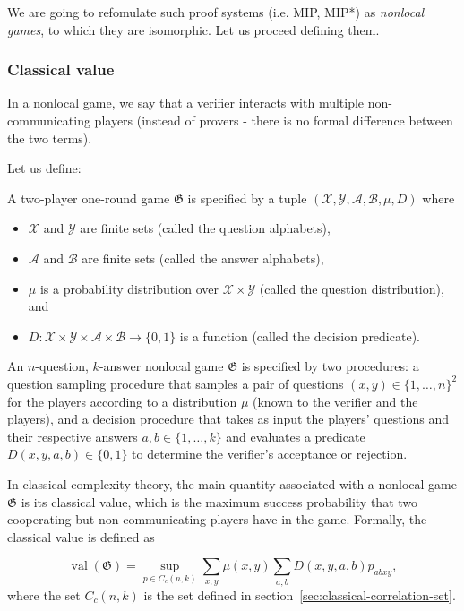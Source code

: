We are going to refomulate such proof systems (i.e. MIP, MIP*) as \emph{nonlocal games}, to which they are isomorphic. Let us proceed defining them.
\subsubsection{Classical value}

In a nonlocal game, we say that a verifier interacts with multiple non-communicating players (instead of provers - there is no formal difference between the two terms). 

Let us define: 

\begin{defn} A two-player one-round game $\mathfrak{G}$ is specified by a tuple $(\mathcal{X}, \mathcal{Y}, \mathcal{A}, \mathcal{B}, \mu, D)$ where
    \begin{itemize}
        \item $\mathcal{X}$ and $\mathcal{Y}$ are finite sets (called the question alphabets),
        \item $\mathcal{A}$ and $\mathcal{B}$ are finite sets (called the answer alphabets),
        \item $\mu$ is a probability distribution over $\mathcal{X} \times \mathcal{Y}$ (called the question distribution), and
        \item $D: \mathcal{X} \times \mathcal{Y} \times \mathcal{A} \times \mathcal{B} \rightarrow\{0,1\}$ is a function (called the decision predicate).
    \end{itemize}
\end{defn}

An $n$-question, $k$-answer nonlocal game $\mathfrak{G}$ is specified by two procedures: a question sampling procedure that samples a pair of questions $(x, y) \in\{1, \ldots, n\}^{2}$ for the players according to a distribution $\mu$ (known to the verifier and the players), and a decision procedure that takes as input the players' questions and their respective answers $a, b \in\{1, \ldots, k\}$ and evaluates a predicate $D(x, y, a, b) \in\{0,1\}$ to determine the verifier's acceptance or rejection.

In classical complexity theory, the main quantity associated with a nonlocal game $\mathfrak{G}$ is its classical value, which is the maximum success probability that two cooperating but non-communicating players have in the game. Formally, the classical value is defined as

\begin{defn}
\begin{equation}\label{eq:classical-value}
\operatorname{val}(\mathfrak{G})=\sup _{p \in C_{c}(n, k)} \sum_{x, y} \mu(x, y) \sum_{a, b} D(x, y, a, b) p_{a b x y},
\end{equation}
where the set $C_{c}(n, k)$ is the set defined in section~\ref{sec:classical-correlation-set}.
\end{defn}

